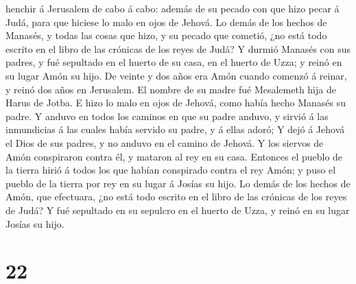 henchir á Jerusalem de cabo á cabo: además de su pecado con que hizo
pecar á Judá, para que hiciese lo malo en ojos de Jehová. 
Lo demás de los hechos de Manasés, y todas las cosas que hizo, y su
pecado que cometió, ¿no está todo escrito en el libro de las crónicas de
los reyes de Judá?  Y durmió Manasés con sus padres, y fué
sepultado en el huerto de su casa, en el huerto de Uzza; y reinó en su
lugar Amón su hijo.  De veinte y dos años era Amón cuando
comenzó á reinar, y reinó dos años en Jerusalem. El nombre de su madre
fué Mesalemeth hija de Harus de Jotba.  E hizo lo malo en
ojos de Jehová, como había hecho Manasés su padre.  Y
anduvo en todos los caminos en que su padre anduvo, y sirvió á las
inmundicias á las cuales había servido su padre, y á ellas adoró;
 Y dejó á Jehová el Dios de sus padres, y no anduvo en el
camino de Jehová.  Y los siervos de Amón conspiraron contra
él, y mataron al rey en su casa.  Entonces el pueblo de la
tierra hirió á todos los que habían conspirado contra el rey Amón; y
puso el pueblo de la tierra por rey en su lugar á Josías su hijo.
 Lo demás de los hechos de Amón, que efectuara, ¿no está
todo escrito en el libro de las crónicas de los reyes de Judá?
 Y fué sepultado en su sepulcro en el huerto de Uzza, y
reinó en su lugar Josías su hijo.

\hypertarget{section-21}{%
\section{22}\label{section-21}}

